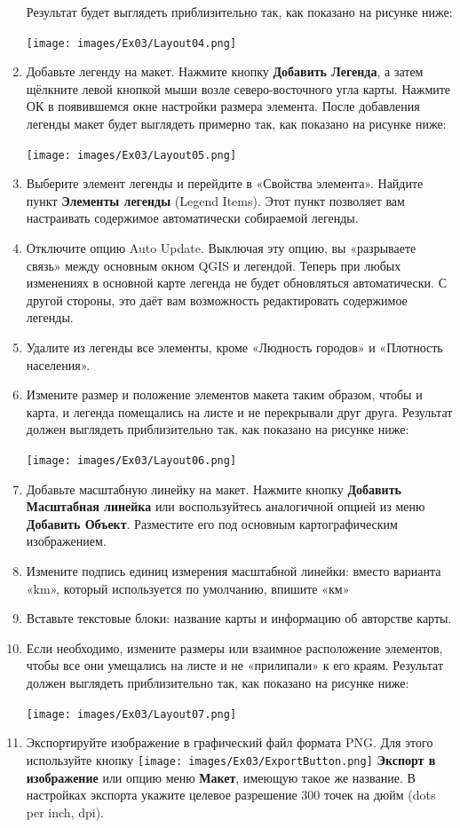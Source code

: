 \documentclass[
  12pt,
]{book}
\begin{document}
\begin{enumerate}
  Результат будет выглядеть приблизительно так, как показано на рисунке ниже:

  \texttt{[image: images/Ex03/Layout04.png]}
\item
  Добавьте легенду на макет. Нажмите кнопку \textbf{Добавить Легенда}, а затем щёлкните левой кнопкой мыши возле северо-восточного угла карты. Нажмите ОК в появившемся окне настройки размера элемента. После добавления легенды макет будет выглядеть примерно так, как показано на рисунке ниже:

  \texttt{[image: images/Ex03/Layout05.png]}
\item
  Выберите элемент легенды и перейдите в «Свойства элемента». Найдите пункт \textbf{Элементы легенды} (Legend Items). Этот пункт позволяет вам настраивать содержимое автоматически собираемой легенды.
\item
  Отключите опцию Auto Update. Выключая эту опцию, вы «разрываете связь» между основным окном QGIS и легендой. Теперь при любых изменениях в основной карте легенда не будет обновляться автоматически. С другой стороны, это даёт вам возможность редактировать содержимое легенды.
\item
  Удалите из легенды все элементы, кроме «Людность городов» и «Плотность населения».
\item
  Измените размер и положение элементов макета таким образом, чтобы и карта, и легенда помещались на листе и не перекрывали друг друга. Результат должен выглядеть приблизительно так, как показано на рисунке ниже:

  \texttt{[image: images/Ex03/Layout06.png]}
\item
  Добавьте масштабную линейку на макет. Нажмите кнопку \textbf{Добавить Масштабная линейка} или воспользуйтесь аналогичной опцией из меню \textbf{Добавить Объект}. Разместите его под основным картографическим изображением.
\item
  Измените подпись единиц измерения масштабной линейки: вместо варианта «km», который используется по умолчанию, впишите «км»
\item
  Вставьте текстовые блоки: название карты и информацию об авторстве карты.
\item
  Если необходимо, измените размеры или взаимное расположение элементов, чтобы все они умещались на листе и не «прилипали» к его краям. Результат должен выглядеть приблизительно так, как показано на рисунке ниже:

  \texttt{[image: images/Ex03/Layout07.png]}
\item
  Экспортируйте изображение в графический файл формата PNG. Для этого используйте кнопку \texttt{[image: images/Ex03/ExportButton.png]} \textbf{Экспорт в изображение} или опцию меню \textbf{Макет}, имеющую такое же название. В настройках экспорта укажите целевое разрешение 300 точек на дюйм (dots per inch, dpi).
\end{enumerate}
\end{document}
